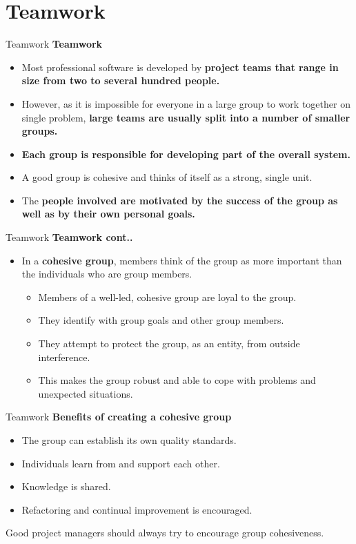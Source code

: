 \documentclass{beamer}
\begin{document}
\section{Teamwork}
\begin{frame}{Teamwork}
\textbf{Teamwork}
\begin{itemize}
	\item Most professional software is developed by \textbf{project teams that range in size from two to several 
		hundred people. }
	\item However, as it is impossible for everyone in a large group to work together on single problem,\textbf{ large 
		teams are usually split into a number of smaller groups. }
	\item\textbf{ Each group is responsible for developing part of the overall system.}
	\item A good group is cohesive and thinks of itself as a strong, single unit. 
	\item The \textbf{people involved are motivated by the success of the group as well as by their own personal goals.}
\end{itemize}
\end{frame}
\begin{frame}{Teamwork}
	\textbf{Teamwork cont..}
	\begin{itemize}
		\item In a \textbf{cohesive group}, members think of the group as more important than the individuals who are group 
		members.
	\begin{itemize}
		\item Members of a well-led, cohesive group are loyal to the group. 
		\item They identify with group goals and other group members. 
		\item They attempt to protect the group, as an entity, from outside interference. 
		\item This makes the group robust and able to cope with problems and unexpected situations.
	\end{itemize}
	\end{itemize}
\end{frame}
\begin{frame}{Teamwork}
	\textbf{Benefits of creating a cohesive group}
	\begin{itemize}
		\item The group can establish its own quality standards. 
		\item Individuals learn from and support each other. 
		\item Knowledge is shared. 
		\item Refactoring and continual improvement is encouraged.
	\end{itemize}
Good project managers should always try to encourage group 
cohesiveness. 
\end{frame}
\end{document}
